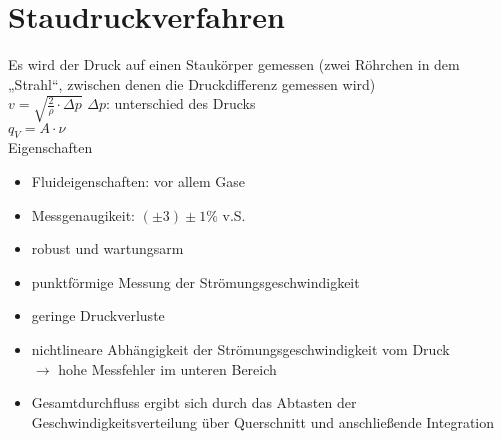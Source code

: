 \section{Staudruckverfahren}
Es wird der Druck auf einen Staukörper gemessen (zwei Röhrchen in dem „Strahl“, zwischen denen die Druckdifferenz gemessen wird)\\
$v=\sqrt{\frac{2}{\rho}\cdot \Delta p}$ \qquad $\Delta p$: unterschied des Drucks\\
$q_V = A \cdot \nu$\\
Eigenschaften
\begin{itemize}
\item Fluideigenschaften: vor allem Gase
\item Messgenaugikeit: $(\pm 3) \pm 1 \%$ v.S.
\end{itemize}
\begin{itemize}[label=$+$]
\item robust und wartungsarm
\item punktförmige Messung der Strömungsgeschwindigkeit
\item geringe Druckverluste
\end{itemize}

\begin{itemize}[label=$-$]
\item nichtlineare Abhängigkeit der Strömungsgeschwindigkeit vom Druck\\
$\to$ hohe Messfehler im unteren Bereich
\item Gesamtdurchfluss ergibt sich durch das Abtasten der Geschwindigkeitsverteilung über Querschnitt und anschließende Integration
\end{itemize}


